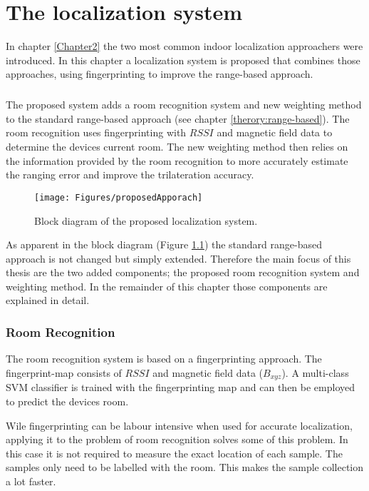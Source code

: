 \chapter{The localization system}

\label{Chapter3}

In chapter \ref{Chapter2} the two most common indoor localization approachers were introduced. In this chapter a localization system is proposed that combines those approaches, using fingerprinting to improve the range-based approach.

\paragraph{}The proposed system adds a room recognition system and new weighting method to the standard range-based approach (see chapter \ref{therory:range-based}). The room recognition uses fingerprinting with $RSSI$ and magnetic field data to determine the devices current room. The new weighting method then relies on the information provided by the room recognition to more accurately estimate the ranging error and improve the trilateration accuracy.

\begin{figure}[ht]
\centering
\texttt{[image: Figures/proposedApporach]}
\decoRule
\caption[Proposed localization system]{Block diagram of the proposed localization system.}
\label{fig:proposedApproach}
\end{figure}

As apparent in the block diagram (Figure \ref{fig:proposedApproach}) the standard range-based approach is not changed but simply extended. Therefore the main focus of this thesis are the two added components; the proposed room recognition system and weighting method. In the remainder of this chapter those components are explained in detail. 

\subsection{Room Recognition}
The room recognition system is based on a fingerprinting approach. The fingerprint-map consists of $RSSI$ and magnetic field data ($B_{xyz}$). A multi-class SVM classifier is trained with the fingerprinting map and can then be employed to predict the devices room.

Wile fingerprinting can be labour intensive when used for accurate localization, applying it to the problem of room recognition solves some of this problem. In this case it is not required to measure the exact location of each sample. The samples only need to be labelled with the room. This makes the sample collection a lot faster.

